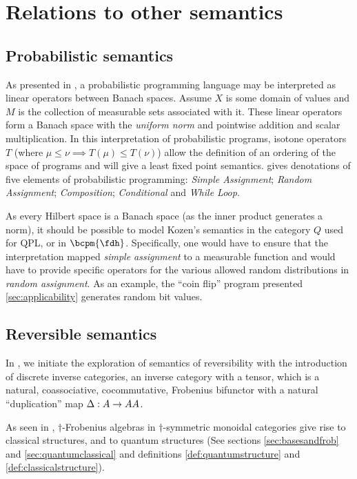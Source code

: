 \section{Relations to other semantics}
\subsection{Probabilistic semantics}
As presented in \cite{kozen-semanticsprobabilistic}, a probabilistic programming language may be
interpreted as linear operators between Banach spaces. Assume $X$ is some domain of values and $M$
is the collection of measurable sets associated with it.
These linear operators form a Banach space with the \emph{uniform norm} and pointwise addition and
scalar multiplication. In this interpretation of probabilistic programs, isotone operators $T$
(where $\mu \le \nu \implies T(\mu) \le T(\nu)$) allow the definition of an ordering of the space
of programs and will give a least fixed point semantics. \cite{kozen-semanticsprobabilistic} gives
denotations of five elements of probabilistic programming: \emph{Simple Assignment}; \emph{Random
Assignment}; \emph{Composition}; \emph{Conditional} and \emph{While Loop}.

As every Hilbert space is a Banach space (as the inner product generates a norm), it should be
possible to model Kozen's semantics in the category $Q$ used for QPL, or in $\bcpm{\fdh}$.
Specifically, one would have to ensure that the interpretation mapped \emph{simple assignment} to a
measurable function and would have to provide specific operators for the various allowed random
distributions in \emph{random assignment}. As an example, the ``coin flip'' program presented
\ref{sec:applicability} generates random bit values.

\subsection{Reversible semantics}
In \cite{gilescockett09}, we initiate the exploration of semantics of reversibility with the
introduction of discrete inverse categories, an inverse category with a tensor, which is a natural,
coassociative, cocommutative, Frobenius bifunctor with a natural ``duplication'' map $\Delta:A\to
A\*A$.

As seen in \cite{coeckeetal08:ortho,coecke08structures}, $\dagger$-Frobenius algebras in
$\dagger$-symmetric monoidal categories give rise to classical structures, and to quantum
structures (See sections \ref{sec:basesandfrob} and \ref{sec:quantumclassical} and definitions
\ref{def:quantumstructure} and \ref{def:classicalstructure}).

